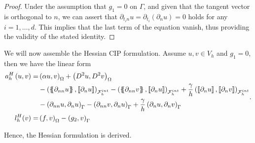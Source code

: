 \begin{proof}
Under the assumption that $g_{1} = 0$ on $\Gamma$, and given that the tangent vector is orthogonal to $n$, we can assert that $ \partial_{t_{i} n} u = \partial_{t_{i}} ( \partial _{n} u ) = 0 $ holds for any $i = 1,\ldots, d$. This implies that the
last term of the equation vanish, thus providing the validity of the stated identity.

\end{proof}


We will now assemble the Hessian CIP formulation. Assume $u,v \in V_{h}$ and $g_{1} = 0$, then we have the linear form
\begin{equation}
\begin{split}
a_{h}^{H} \left( u, v \right)   =&
    \left( \alpha  u, v \right) _{\Omega }   +  \left( D^2 u, D^2v \right) _{\Omega } \\
 & - \left( \mean{  \partial _{n n} u }, \jump{ \partial _{n }u} \right)_{\mathcal{F}_{h}^{int}}  -
 \left( \mean{ \partial _{n n} v }, \jump{ \partial _{n}u }      \right)_{\mathcal{F}_{h}^{int}}  + \frac{\gamma }{h}  \left( \jump{ \partial _{n} u}, \jump{ \partial _{n} v   }   \right)_{\mathcal{F}_{h}^{int}} \\
 & - \left(   \partial _{n n} u ,  \partial _{n }u \right)_{\Gamma }  -
 \left(  \partial _{n n} v ,  \partial _{n}u       \right)_{\Gamma }  + \frac{\gamma }{h}  \left(  \partial _{n} u,  \partial _{n} v      \right)_{\Gamma }   \\
 l_{h}^{H}( v)  =&  \left( f, v \right) _{\Omega }  - \left(g_{2}, v  \right) _{\Gamma }
\end{split}
.
\end{equation}

Hence, the Hessian formulation is derived.





